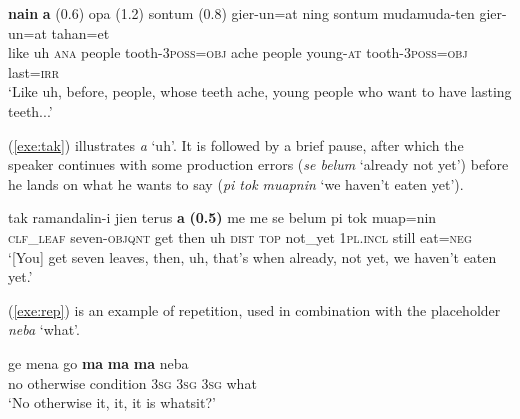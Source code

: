 \documentclass[output=paper,colorlinks,citecolor=brown
\ChapterDOI{10.5281/zenodo.15697587}
]{langscibook}
\begin{document}
\ea \label{exe:naina}
\gll \textbf{nain} \textbf{a} (0.6) opa (1.2) sontum (0.8) gier-un=at ning sontum mudamuda-ten gier-un=at tahan=et\\
like uh {} \textsc{ana} {} people {} tooth-\textsc{3poss=obj} ache people young-\textsc{at} tooth-\textsc{3poss=obj} last=\textsc{irr}\\
\glt `Like uh, before, people, whose teeth ache, young people who want to have lasting teeth...'  
\z 

(\ref{exe:tak}) illustrates \textit{a} `uh'. It is followed by a brief pause, after which the speaker continues with some production errors (\textit{se belum} `already not yet') before he lands on what he wants to say (\textit{pi tok muapnin} `we haven't eaten yet').

\ea 	\label{exe:tak}
\gll tak ramandalin-i jien terus \textbf{a} \textbf{(0.5)} me me se belum pi tok muap=nin\\
\textsc{clf\_leaf} seven-\textsc{objqnt} get then uh {} \textsc{dist} \textsc{top} {\glse} not\_yet \textsc{1pl.incl} still eat=\textsc{neg}\\
\glt 	`[You] get seven leaves, then, uh, that's when already, not yet, we haven't eaten yet.' 
\z 



(\ref{exe:rep}) is an example of repetition, used in combination with the placeholder \textit{neba} `what'.

\ea 	\label{exe:rep}
\gll ge mena go \textbf{ma} \textbf{ma} \textbf{ma} neba\\
no otherwise condition \textsc{3sg} \textsc{3sg} \textsc{3sg} what\\
\glt 	`No otherwise it, it, it is whatsit?' 
\z 

\end{document}
